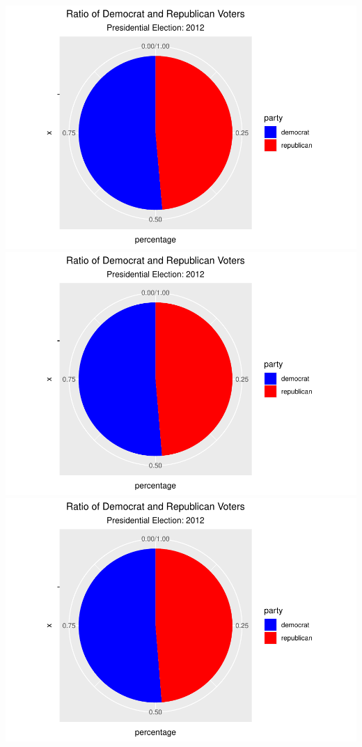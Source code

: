 \documentclass[
]{article}
\begin{document}
\includegraphics{election_files/figure-latex/anim-88.pdf}
\includegraphics{election_files/figure-latex/anim-89.pdf}
\includegraphics{election_files/figure-latex/anim-90.pdf}
\end{document}
